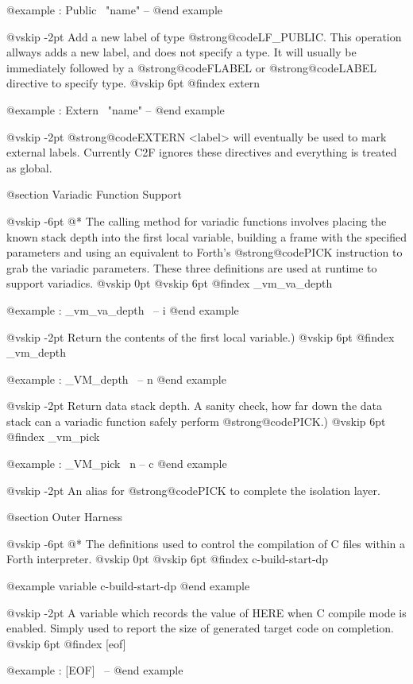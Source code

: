 @example
: Public                \ "name" -- @end example

@vskip -2pt
Add a new label of type @strong{@code{LF_PUBLIC}}. This operation allways adds a
new label, and does not specify a type. It will usually be immediately
followed by a @strong{@code{FLABEL}} or @strong{@code{LABEL}} directive to specify type.
@vskip 6pt
@findex extern

@example
: Extern                \ "name" -- @end example

@vskip -2pt
@strong{@code{EXTERN <label>}} will eventually be used to mark external labels.
Currently C2F ignores these directives and everything is treated as
global.

@section Variadic Function Support


@vskip -6pt
@*
The calling method for variadic functions involves placing the
known stack depth into the first local variable, building a frame
with the specified parameters and using an equivalent to Forth's
@strong{@code{PICK}} instruction to grab the variadic parameters. These three
definitions are used at runtime to support variadics.
@vskip 0pt
@vskip 6pt
@findex _vm_va_depth

@example
: _vm_va_depth          \ -- i @end example

@vskip -2pt
Return the contents of the first local variable.)
@vskip 6pt
@findex _vm_depth

@example
: _VM_depth             \ -- n @end example

@vskip -2pt
Return data stack depth. A sanity check, how far down the data
stack can a variadic function safely perform @strong{@code{PICK}}.)
@vskip 6pt
@findex _vm_pick

@example
: _VM_pick              \ n -- c @end example

@vskip -2pt
An alias for @strong{@code{PICK}} to complete the isolation layer.

@section Outer Harness


@vskip -6pt
@*
The definitions used to control the compilation of C files within
a Forth interpreter.
@vskip 0pt
@vskip 6pt
@findex c-build-start-dp

@example
variable        c-build-start-dp @end example

@vskip -2pt
A variable which records the value of HERE when C compile mode
is enabled. Simply used to report the size of generated target code
on completion.
@vskip 6pt
@findex [eof]

@example
: [EOF]                 \ -- @end example

